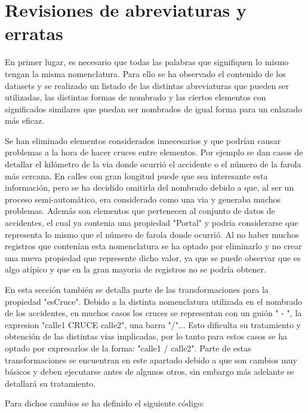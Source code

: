 
\section{Revisiones de abreviaturas y erratas}


En primer lugar, es necesario que todas las palabras que signifiquen lo mismo tengan la misma nomenclatura. Para ello se ha observado el contenido de los datasets y se realizado un listado de las distintas abreviaturas que pueden ser utilizadas, las distintas formas de nombrado y las ciertos elementos con significados similares que puedan ser nombrados de igual forma para un enlazado más eficaz.

Se han eliminado elementos considerados innecesarios y que podrían causar problemas a la hora de hacer cruces entre elementos. Por ejemplo se dan casos de detallar el kilómetro de la via donde ocurrió el accidente o el número de la farola más cercana. En calles con gran longitud puede que sea interesante esta información, pero se ha decidido omitirla del nombrado debido a que, al ser un proceso semi-automático, era considerado como una via y generaba muchos problemas. Además son elementos que pertenecen al conjunto de datos de accidentes, el cual ya contenia una propiedad "Portal" y podria considerarse que representa lo mismo que el número de farola donde ocurrió. Al no haber muchos registros que contenían esta nomenclatura se ha optado por eliminarlo y no crear una nueva propiedad que represente dicho valor, ya que se puede observar que es algo atípico y que en la gran mayoria de registros no se podría obtener.

En esta sección también se detalla parte de las transformaciones para la propiedad "esCruce". Debido a la distinta nomenclatura utilizada en el nombrado de los accidentes, en muchos casos los cruces se representan con un guión " - ", la expresion "calle1 CRUCE calle2", una barra "/"... Esto dificulta su tratamiento y obtención de las distintas vias implicadas, por lo tanto para estos casos se ha optado por expresarlos de la forma: "calle1 / calle2". Parte de estas transformaciones se encuentran en este apartado debido a que son cambios muy básicos y deben ejecutarse antes de algunos otros, sin embargo más adelante se detallará su tratamiento.









Para dichos cambios se ha definido el siguiente código:

